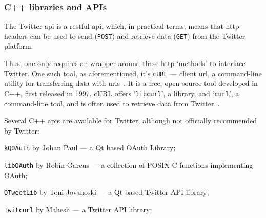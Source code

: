   


\subsubsection{C++ libraries and APIs}
\label{sec:c++-libraries-apis}
The Twitter \gls{api} is a \gls{rest}ful \gls{api}, which, in practical terms,
means that \gls{http} headers can be used to send (\texttt{POST}) and retrieve
data (\texttt{GET}) from the Twitter platform.

Thus, one only requires an wrapper around these \gls{http} `methods' to
interface Twitter. One such tool, as aforementioned, it's \texttt{cURL} ---
client \gls{url}, a
command-line utility for transferring data with \glspl{url}~\cite{curl}. It is a free,
open-source tool developed in C++, first released in 1997. cURL offers
`\texttt{libcurl}', a library, and `\texttt{curl}', a command-line tool, and is
often used to retrieve data from Twitter~\cite{twitterCreatingLibsC}.

Several C++ \glspl{api} are available for Twitter, although not officially
recommended by Twitter:
\begin{enum-c}
\item \texttt{kQOAuth} by Johan Paul --- a Qt based OAuth Library;
\item \texttt{libOAuth} by Robin Gareus --- a collection of POSIX-C functions implementing OAuth;
\item \texttt{QTweetLib} by Toni Jovanoski --- a Qt based Twitter API library;
\item \texttt{Twitcurl} by Mahesh --- a Twitter API library;
\end{enum-c}


